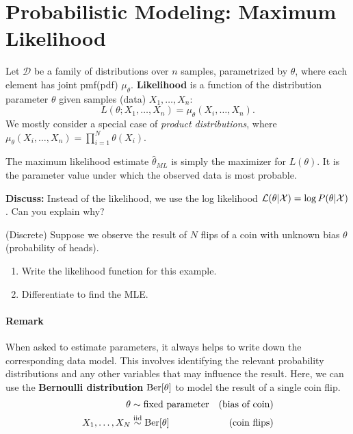 \documentclass{discussion}
\begin{document}
\section{Probabilistic Modeling: Maximum Likelihood}

Let $\mathcal{D}$ be a family of distributions over $n$ samples, parametrized by $\theta$, where each element has joint pmf(pdf) $\mu_\theta$. \textbf{Likelihood} is a function of the distribution parameter $\theta$ given samples (data) $X_1, \ldots, X_n$:
\[L(\theta; X_1, \ldots, X_n) = \mu_\theta(X_i, \ldots, X_n).\]
We mostly consider a special case of \emph{product distributions}, where $\mu_\theta(X_i, \ldots, X_n) = \prod_{i=1}^{N} \theta(X_i).$

The maximum likelihood estimate $\hat{\theta}_{ML}$ is simply the maximizer for $L(\theta)$. It is the parameter value under which the observed data is most probable.




\textbf{Discuss:} Instead of the likelihood, we use the log likelihood $\mathcal{L}(\theta|\mathcal{X}) = \log P(\theta|\mathcal{X})$. Can you explain why?

\vspace{1em}

\begin{exercise}(Discrete)
Suppose we observe the result of $N$ flips of a coin with unknown bias $\theta$ (probability of heads).  
\begin{enumerate}
\item Write the likelihood function for this example.
\item Differentiate to find the MLE. 
\end{enumerate}
\end{exercise}

\paragraph{Remark}When asked to estimate parameters, it always helps to write down the corresponding data model.  This involves identifying the relevant probability distributions and any other variables that may influence the result.  Here, we can use the \textbf{Bernoulli distribution} $\text{Ber}[\theta]$ to model the result of a single coin flip.
    \begin{align*}
    \theta &\sim \text{fixed parameter} & \text{(bias of coin)} \\
    X_1, \dots, X_N &\stackrel{\text{iid}}{\sim} \text{Ber}[\theta] & \text{(coin flips)}
    \end{align*}
\end{document}
